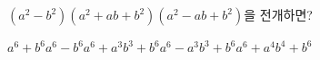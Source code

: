 $(a^2-b^2)(a^2+ab+b^2)(a^2-ab+b^2)$을 전개하면?
\begin{choicesii}{$a^6+b^6$}{$a^6-b^6$}{$a^6+a^3b^3+b^6$}{$a^6-a^3b^3+b^6$}{$a^6+a^4b^4+b^6$}\end{choicesii}
